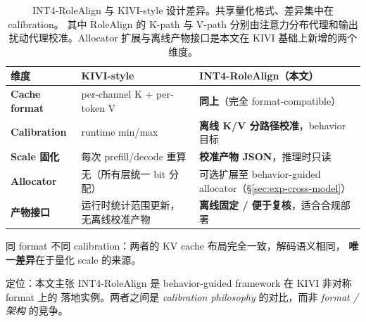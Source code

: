 \begin{table}[!htbp]
  \centering
  \small
  \setlength{\tabcolsep}{4pt}
  \begin{threeparttable}
  \begin{tabular}{l l l}
    \toprule
    \textbf{维度} & \textbf{KIVI-style}~\cite{liu2024kivi} & \textbf{INT4-RoleAlign}（本文） \\
    \midrule
    \textbf{Cache format} &
      per-channel K + per-token V &
      \textbf{同上}（完全 format-compatible） \\
    \addlinespace[2pt]
    \textbf{Calibration} &
      runtime min/max &
      \textbf{离线 K/V 分路径校准}，behavior 目标 \\
    \addlinespace[2pt]
    \textbf{Scale 固化} &
      每次 prefill/decode 重算 &
      \textbf{校准产物 JSON}，推理时只读 \\
    \addlinespace[2pt]
    \textbf{Allocator} &
      无（所有层统一 bit 分配） &
      可选扩展至 behavior-guided allocator（§\ref{sec:exp-cross-model}） \\
    \addlinespace[2pt]
    \textbf{产物接口} &
      运行时统计范围更新，无离线校准产物 &
      \textbf{离线固定 / 便于复核}，适合合规部署 \\
    \bottomrule
  \end{tabular}
  \begin{tablenotes}
    \footnotesize
    \item 同 format 不同 calibration：两者的 KV cache 布局完全一致，解码语义相同，
    \textbf{唯一差异}在于量化 scale 的来源。
    \item 定位：本文主张 INT4-RoleAlign 是 behavior-guided framework 在 KIVI 非对称 format 上的
    落地实例。两者之间是 \emph{calibration philosophy}
    的对比，而非 \emph{format / 架构} 的竞争。
  \end{tablenotes}
  \end{threeparttable}
  \caption{INT4-RoleAlign 与 KIVI-style 设计差异。共享量化格式、差异集中在 calibration。
  其中 RoleAlign 的 K-path 与 V-path 分别由注意力分布代理和输出扰动代理校准。Allocator 扩展与离线产物接口是本文在 KIVI 基础上新增的两个维度。}
  \label{tab:app-rolealign-vs-kivi}
\end{table}

